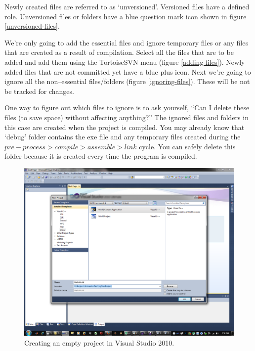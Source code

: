 \documentclass[12pt,a4paper]{article}
\begin{document}
Newly created files are referred to as `unversioned'. Versioned files have a defined role. Unversioned files or folders have a blue question mark icon shown in figure \ref{unversioned-files}.

We're only going to add the essential files and ignore temporary files or any files that are created as a result of compilation. Select all the files that are to be added and add them using the TortoiseSVN menu (figure \ref{adding-files}). Newly added files that are not committed yet have a blue plus icon. Next we're going to ignore all the non--essential files/folders (figure \ref{ignoring-files}). These will be not be tracked for changes.

One way to figure out which files to ignore is to ask yourself, ``Can I delete these files (to save space) without affecting anything?'' The ignored files and folders in this case are created when the project is compiled. You may already know that `debug' folder contains the exe file and any temporary files created during the $pre-process > compile > assemble > link$ cycle. You can safely delete this folder because it is created every time the program is compiled. 
\begin{figure}[H]
\centering
\includegraphics[scale=0.45]{NewProjectinVS2010.png}
\caption{Creating an empty project in Visual Studio 2010.}
\label{VS2010-new-project}
\end{figure}
\end{document}
